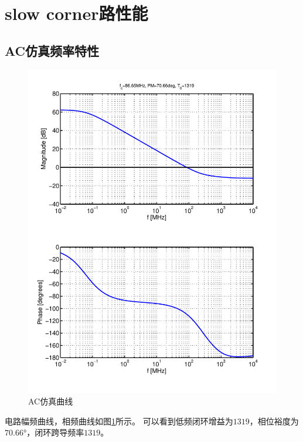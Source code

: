 \documentclass[a4paper]{article}
\newcommand{\udeg}{\si{\degree}}
\begin{document}

\clearpage
\newpage

\section{slow corner路性能}
\subsection{AC仿真频率特性}
\begin{figure}[htb]
    \begin{center}
        \includegraphics[width=\textwidth]{slow/ac.pdf}
    \end{center}
    \caption{AC仿真曲线}
    \label{slowac}
\end{figure}
电路幅频曲线，相频曲线如图\ref{slowac}所示。
可以看到低频闭环增益为$1319$，相位裕度为$70.66\udeg$，闭环跨导频率$1319$。
\newpage
\clearpage
\end{document}
